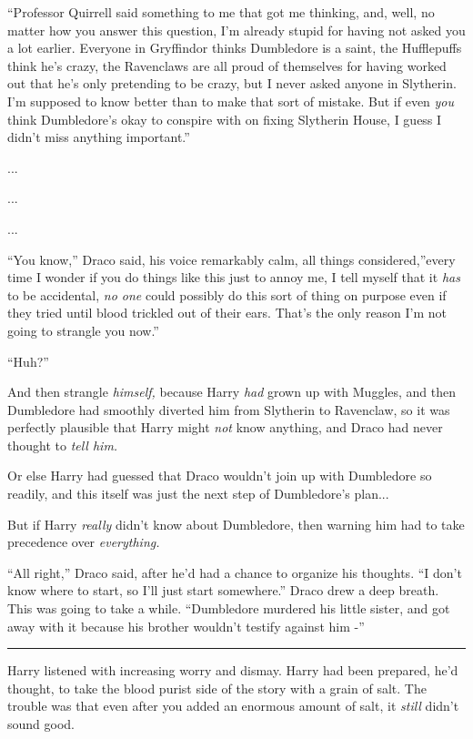 ``Professor Quirrell said something to me that got me thinking, and,
well, no matter how you answer this question, I'm already stupid for
having not asked you a lot earlier. Everyone in Gryffindor thinks
Dumbledore is a saint, the Hufflepuffs think he's crazy, the Ravenclaws
are all proud of themselves for having worked out that he's only
pretending to be crazy, but I never asked anyone in Slytherin. I'm
supposed to know better than to make that sort of mistake. But if even
\emph{you} think Dumbledore's okay to conspire with on fixing Slytherin
House, I guess I didn't miss anything important.''

...

...

...

``You know,'' Draco said, his voice remarkably calm, all things
considered,''every time I wonder if you do things like this just to
annoy me, I tell myself that it \emph{has} to be accidental, \emph{no
one} could possibly do this sort of thing on purpose even if they tried
until blood trickled out of their ears. That's the only reason I'm not
going to strangle you now.''

``Huh?''

And then strangle \emph{himself,} because Harry \emph{had} grown up with
Muggles, and then Dumbledore had smoothly diverted him from Slytherin to
Ravenclaw, so it was perfectly plausible that Harry might \emph{not}
know anything, and Draco had never thought to \emph{tell him.}

Or else Harry had guessed that Draco wouldn't join up with Dumbledore so
readily, and this itself was just the next step of Dumbledore's
plan...

But if Harry \emph{really} didn't know about Dumbledore, then warning
him had to take precedence over \emph{everything.}

``All right,'' Draco said, after he'd had a chance to organize his
thoughts. ``I don't know where to start, so I'll just start somewhere.''
Draco drew a deep breath. This was going to take a while. ``Dumbledore
murdered his little sister, and got away with it because his brother
wouldn't testify against him -''

\begin{center}\rule{3in}{0.4pt}\end{center}

Harry listened with increasing worry and dismay. Harry had been
prepared, he'd thought, to take the blood purist side of the story with
a grain of salt. The trouble was that even after you added an enormous
amount of salt, it \emph{still} didn't sound good.

